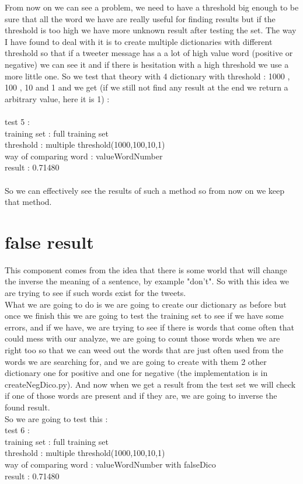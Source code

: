 \documentclass{article}
\begin{document}
From now on we can see a problem, we need to have a threshold big enough to be sure that all the word we have are really useful for finding results but if the threshold is too high we have more unknown result after testing the set. The  way I have found to deal with it is to create multiple dictionaries with different threshold so that if a tweeter message has a a lot of high value word (positive or negative) we can see it and if there is hesitation with a high threshold we use a more little one. So we test that theory with 4 dictionary with threshold : 1000 , 100 , 10 and 1 and we get (if we still not find any result at the end we return a arbitrary value, here it is 1) :  \\
 \\
 test 5 :\\ 
 training set : full training set\\
 threshold : multiple threshold(1000,100,10,1)\\
 way of comparing word : valueWordNumber \\
 result :  0.71480\\
 \\
So we can effectively see the results of such a method so from now on we keep that method.

\section{false result}

This component comes from the idea that there is some world that will change the inverse the meaning of a sentence, by example "don't". So with this idea we are trying to see if such words exist for the tweets.\\
What we are going to do is we are going to create our dictionary as before but once we finish this we are going to test the training set to see if we have some errors, and if we have, we are trying to see if there is words that come often that could mess with our analyze, we are going to count those words when we are right too so that we can weed out the words that are just often used from the words we are searching for, and we are going to create with them 2 other dictionary one for positive and one for negative (the implementation is in createNegDico.py). And now when we get a result from the test set we will check if one of those words are present and if they are, we are going to inverse the found result.\\
So we are going to test this :
 \\
 test 6 :\\ 
 training set : full training set\\
 threshold : multiple threshold(1000,100,10,1)\\
 way of comparing word : valueWordNumber with falseDico\\
 result :  0.71480\\
 \\
\end{document}
